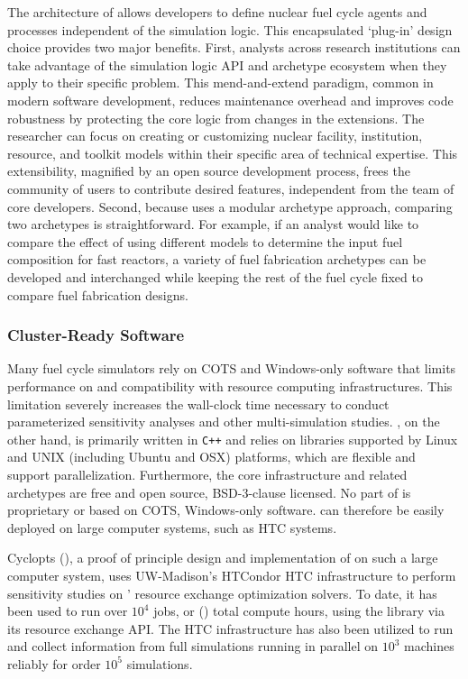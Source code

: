 The architecture of \Cyclus allows developers 
to define nuclear fuel cycle agents and processes independent of the simulation 
logic. This encapsulated `plug-in'
design choice provides two major benefits. First, analysts across research institutions can take advantage of the 
simulation logic \gls{API} and archetype ecosystem when they apply \Cyclus to 
their specific problem. This 
mend-and-extend paradigm, common in modern software development, reduces 
maintenance overhead and improves code robustness by protecting the core logic 
from changes in the extensions. 
The researcher can focus on creating or customizing nuclear 
facility, institution, resource, and toolkit models within their specific area 
of technical expertise. This extensibility, magnified by an open source 
development process, frees the community of users to contribute desired 
features, independent from the team of \Cyclus core developers. 
Second, because \Cyclus uses a modular archetype approach, comparing two 
archetypes is straightforward. For example, if an analyst would like 
to compare the effect of using different models to determine the input fuel 
composition for fast reactors, a variety of fuel fabrication archetypes can be 
developed and interchanged while keeping the rest of the fuel cycle fixed
 to compare fuel fabrication designs.

\subsubsection{Cluster-Ready Software}

Many fuel cycle simulators rely on \gls{COTS} and Windows-only software that limits 
performance on and compatibility with resource computing infrastructures. This limitation severely 
increases the wall-clock time necessary to conduct parameterized sensitivity 
analyses and other multi-simulation studies. \Cyclus, on the other hand, is 
primarily written in \texttt{C++} and relies on 
libraries supported by Linux and UNIX (including Ubuntu and OSX) platforms, 
which are flexible and support parallelization. 
Furthermore, the core infrastructure and related archetypes are free and 
open source, BSD-3-clause licensed. No part of \Cyclus is proprietary or based 
on \gls{COTS}, Windows-only software. \Cyclus can therefore be easily deployed 
on large computer systems, such as \gls{HTC} systems.

Cyclopts (), a proof of principle design and implementation of \Cyclus on such a large computer system,
 uses UW-Madison's HTCondor \gls{HTC} infrastructure to perform sensitivity
studies on \Cyclus' resource exchange optimization solvers. To date, it has been
used to run over $10^4$ jobs, or () total compute hours, using
the \Cyclus library via its resource exchange \gls{API}.
The \gls{HTC} infrastructure has also been utilized to run and collect
information from full \Cyclus simulations running in parallel on $10^3$
machines reliably for order $10^5$ simulations.

